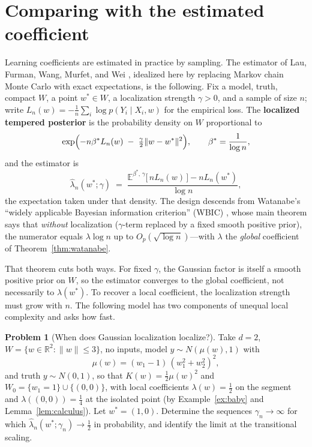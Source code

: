 \documentclass[11pt]{amsart}
\theoremstyle{plain}
\theoremstyle{definition}
\newtheorem{problem}[theorem]{Problem}
\newcommand{\R}{\mathbb{R}}
\newcommand{\E}{\mathbb{E}}
\begin{document}
\section{Comparing with the estimated coefficient}\label{sec:estimator}

Learning coefficients are estimated in practice by sampling. The estimator of Lau, Furman, Wang, Murfet, and Wei \cite{lau2023}, idealized here by replacing Markov chain Monte Carlo with exact expectations, is the following. Fix a model, truth, compact $W$, a point $w^* \in W$, a localization strength $\gamma > 0$, and a sample of size $n$; write $L_n(w) = -\frac1n \sum_i \log p(Y_i \mid X_i, w)$ for the empirical loss. The \textbf{localized tempered posterior} is the probability density on $W$ proportional to
\[
   \exp\Bigl( -n\beta^* L_n(w) \;-\; \tfrac{\gamma}{2}\|w - w^*\|^2 \Bigr),
   \qquad \beta^* = \frac{1}{\log n},
\]
and the estimator is
\[
   \hat\lambda_n(w^*; \gamma) \;=\; \frac{\E^{\beta^*\!,\,\gamma}\bigl[\, n L_n(w) \,\bigr] - n L_n(w^*)}{\log n},
\]
the expectation taken under that density. The design descends from Watanabe's ``widely applicable Bayesian information criterion'' (WBIC) \cite{watanabe2013}, whose main theorem says that \emph{without} localization ($\gamma$-term replaced by a fixed smooth positive prior), the numerator equals $\lambda \log n$ up to $O_p(\sqrt{\log n})$---with $\lambda$ the \emph{global} coefficient of Theorem~\ref{thm:watanabe}.

That theorem cuts both ways. For fixed $\gamma$, the Gaussian factor is itself a smooth positive prior on $W$, so the estimator converges to the global coefficient, not necessarily to $\lambda(w^*)$. To recover a local coefficient, the localization strength must grow with $n$. The following model has two components of unequal local complexity and asks how fast.

\begin{problem}[When does Gaussian localization localize?]\label{prob:estimator}
Take $d = 2$, $W = \{w \in \R^2 : \|w\| \le 3\}$, no inputs, model $y \sim N(\mu(w), 1)$ with
\[
   \mu(w) = (w_1 - 1)\,(w_1^2 + w_2^2)^2,
\]
and truth $y \sim N(0,1)$, so that $K(w) = \tfrac12 \mu(w)^2$ and $W_0 = \{w_1 = 1\} \cup \{(0,0)\}$, with local coefficients $\lambda(w) = \tfrac12$ on the segment and $\lambda((0,0)) = \tfrac14$ at the isolated point \textup{(}by Example~\textup{\ref{ex:baby}} and Lemma~\textup{\ref{lem:calculus}}\textup{)}. Let $w^* = (1, 0)$.
Determine the sequences $\gamma_n \to \infty$ for which $\hat\lambda_n(w^*;\gamma_n)\to\tfrac12$ in probability, and identify the limit at the transitional scaling.
\end{problem}
\end{document}
